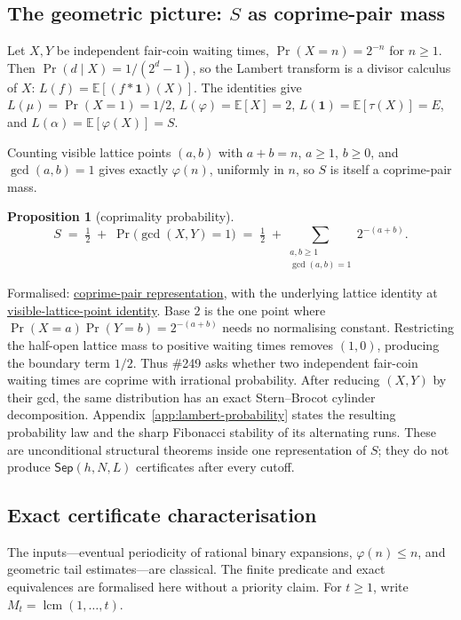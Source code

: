 \documentclass[11pt]{article}
\newcommand{\commit}{99f4bf47422abbd8757cbb22b50ba079d764d3a7}
\newcommand{\repobase}{https://github.com/wcook04/plectis-erdos/blob/\commit}
\newcommand{\PK}{Erdos249257}
\newcommand{\lword}[4]{\href{\repobase/\PK/#1\#L#2}{#4}}
\newtheorem{proposition}[theorem]{Proposition}
\theoremstyle{definition}
\theoremstyle{remark}
\newcommand{\ph}{\varphi}
\newcommand{\lcm}{\operatorname{lcm}}
\begin{document}
\subsection{The geometric picture: $S$ as coprime-pair mass}\label{sec:geom}

Let $X,Y$ be independent fair-coin waiting times, $\Pr(X=n)=2^{-n}$ for $n\ge1$.
Then $\Pr(d\mid X)=1/(2^d-1)$, so the Lambert transform is a divisor calculus of
$X$: $L(f)=\mathbb E[(f*\mathbf 1)(X)]$.  The identities give $L(\mu)=\Pr(X=1)=1/2$,
$L(\ph)=\mathbb E[X]=2$, $L(\mathbf 1)=\mathbb E[\tau(X)]=E$, and
$L(\alpha)=\mathbb E[\ph(X)]=S$.

Counting visible lattice points $(a,b)$ with $a+b=n$, $a\ge1$, $b\ge0$, and $\gcd(a,b)=1$ gives
exactly $\ph(n)$, uniformly in $n$, so $S$ is itself a coprime-pair mass.

\begin{proposition}[coprimality probability]\label{res:coprime}
\[
S \;=\; \tfrac12 \;+\; \Pr\!\big(\gcd(X,Y)=1\big)
\;=\; \tfrac12 \;+\!\!\sum_{\substack{a,b\ge1\\ \gcd(a,b)=1}}\!\! 2^{-(a+b)}.
\]
\end{proposition}
\noindent Formalised: \lword{CertificateKernel.lean}{18557}{totient_series_eq_half_add_visible_coprime_pairs}{coprime-pair representation},
with the underlying lattice identity at
\lword{CertificateKernel.lean}{18544}{tsum_visible_coprime_pairs_eq_totient_series}{visible-lattice-point identity}.
Base $2$ is the one point where $\Pr(X=a)\Pr(Y=b)=2^{-(a+b)}$ needs no normalising
constant.  Restricting the half-open lattice mass to positive waiting times
removes $(1,0)$, producing the boundary term $1/2$.  Thus \#249 asks whether two independent
fair-coin waiting times are coprime with irrational probability.
After reducing $(X,Y)$ by their gcd, the same distribution has an exact
Stern--Brocot cylinder decomposition.
Appendix~\ref{app:lambert-probability} states the resulting probability law
and the sharp Fibonacci stability of its alternating runs.  These are
unconditional structural theorems inside one representation of \(S\); they
do not produce \(\mathsf{Sep}(h,N,L)\) certificates after every cutoff.

\subsection{Exact certificate characterisation}\label{sec:reduction}

The inputs---eventual periodicity of rational binary expansions,
$\ph(n)\le n$, and geometric tail estimates---are classical.  The finite
predicate and exact equivalences are formalised here without a priority claim.
For $t\ge1$, write $M_t=\lcm(1,\ldots,t)$.
\end{document}
